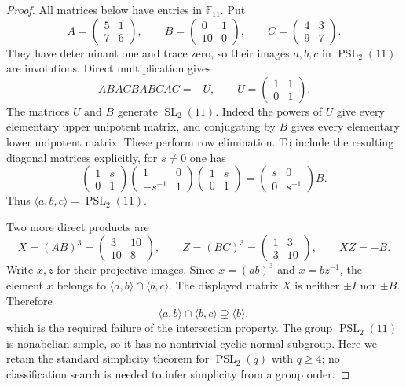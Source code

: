 \documentclass[11pt,a4paper]{article}
\begin{document}
\begin{proof}
All matrices below have entries in $\mathbb F_{11}$. Put
\[
 A=\begin{pmatrix}5&1\\7&6\end{pmatrix},\qquad
 B=\begin{pmatrix}0&1\\10&0\end{pmatrix},\qquad
 C=\begin{pmatrix}4&3\\9&7\end{pmatrix}.
\]
They have determinant one and trace zero, so their images $a,b,c$ in
$\operatorname{PSL}_2(11)$ are involutions. Direct multiplication gives
\[
 ABACBABCAC=-U,\qquad U=\begin{pmatrix}1&1\\0&1\end{pmatrix}.
\]
The matrices $U$ and $B$ generate $\operatorname{SL}_2(11)$. Indeed the
powers of $U$ give every elementary upper unipotent matrix, and conjugating
by $B$ gives every elementary lower unipotent matrix. These perform row
elimination. To include the resulting diagonal matrices explicitly, for
$s\ne0$ one has
\[
 \begin{pmatrix}1&s\\0&1\end{pmatrix}
 \begin{pmatrix}1&0\\-s^{-1}&1\end{pmatrix}
 \begin{pmatrix}1&s\\0&1\end{pmatrix}
 =\begin{pmatrix}s&0\\0&s^{-1}\end{pmatrix}B.
\]
Thus $\langle a,b,c\rangle=\operatorname{PSL}_2(11)$.

Two more direct products are
\[
 X=(AB)^3=\begin{pmatrix}3&10\\10&8\end{pmatrix},\qquad
 Z=(BC)^3=\begin{pmatrix}1&3\\3&10\end{pmatrix},\qquad XZ=-B.
\]
Write $x,z$ for their projective images. Since $x=(ab)^3$ and
$x=bz^{-1}$, the element $x$ belongs to
$\langle a,b\rangle\cap\langle b,c\rangle$. The displayed matrix $X$
is neither $\pm I$ nor $\pm B$. Therefore
\[
 \langle a,b\rangle\cap\langle b,c\rangle
                  \supsetneq\langle b\rangle,
\]
which is the required failure of the intersection property. The group
$\operatorname{PSL}_2(11)$ is nonabelian simple, so it has no nontrivial
cyclic normal subgroup. Here we retain the standard simplicity theorem
for $\operatorname{PSL}_2(q)$ with $q\ge4$; no classification search is
needed to infer simplicity from a group order.


\end{proof}
\end{document}
